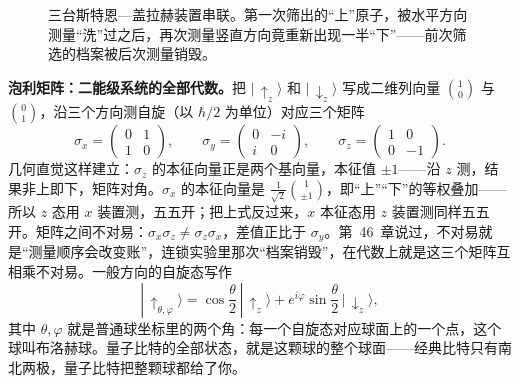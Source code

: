 \begin{figure}[htbp]
\centering
{}
\caption{三台斯特恩—盖拉赫装置串联。第一次筛出的“上”原子，被水平方向测量“洗”过之后，再次测量竖直方向竟重新出现一半“下”——前次筛选的档案被后次测量销毁。}
\end{figure}

\begin{mathbridge}
\textbf{泡利矩阵：二能级系统的全部代数。}把 $|\,{\uparrow}_z\rangle$ 和 $|\,{\downarrow}_z\rangle$ 写成二维列向量 $\binom{1}{0}$ 与 $\binom{0}{1}$，沿三个方向测自旋（以 $\hbar/2$ 为单位）对应三个矩阵
\[
\sigma_x=\begin{pmatrix}0&1\\[2pt]1&0\end{pmatrix},\qquad
\sigma_y=\begin{pmatrix}0&-i\\[2pt]i&0\end{pmatrix},\qquad
\sigma_z=\begin{pmatrix}1&0\\[2pt]0&-1\end{pmatrix}.
\]
几何直觉这样建立：$\sigma_z$ 的本征向量正是两个基向量，本征值 $\pm1$——沿 $z$ 测，结果非上即下，矩阵对角。$\sigma_x$ 的本征向量是 $\tfrac{1}{\sqrt2}\binom{1}{\pm1}$，即“上”“下”的等权叠加——所以 $z$ 态用 $x$ 装置测，五五开；把上式反过来，$x$ 本征态用 $z$ 装置测同样五五开。矩阵之间不对易：$\sigma_x\sigma_z\neq\sigma_z\sigma_x$，差值正比于 $\sigma_y$。第~46~章说过，不对易就是“测量顺序会改变账”，连锁实验里那次“档案销毁”，在代数上就是这三个矩阵互相乘不对易。一般方向的自旋态写作
\[
|\,{\uparrow}_{\theta,\varphi}\rangle=\cos\frac{\theta}{2}\,|\,{\uparrow}_z\rangle+e^{i\varphi}\sin\frac{\theta}{2}\,|\,{\downarrow}_z\rangle ,
\]
其中 $\theta,\varphi$ 就是普通球坐标里的两个角：每一个自旋态对应球面上的一个点，这个球叫布洛赫球。量子比特的全部状态，就是这颗球的整个球面——经典比特只有南北两极，量子比特把整颗球都给了你。
\end{mathbridge}

